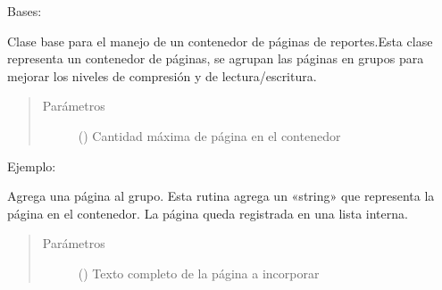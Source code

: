\documentclass[a4paper,12pt,spanish]{sphinxmanual}
\begin{document}
\begin{fulllineitems}
\label{\detokenize{openerm.PageContainer:openerm.PageContainer.PageContainer}}
Bases: 

Clase base para el manejo de un contenedor de páginas de reportes.Esta clase
representa un contenedor de páginas, se agrupan las páginas en grupos para mejorar
los niveles de compresión y de lectura/escritura.
\begin{quote}\begin{description}
\item[{Parámetros}] \leavevmode
{} () \textendash{} Cantidad máxima de página en el contenedor

\end{description}\end{quote}

Ejemplo:

\begin{sphinxVerbatim}[commandchars=\\\{\}]
   
  
\end{sphinxVerbatim}

\begin{fulllineitems}
\label{\detokenize{openerm.PageContainer:openerm.PageContainer.PageContainer.add}}
Agrega una página al grupo.     Esta rutina agrega un «string» que representa
la página en el contenedor. La página queda registrada en una lista interna.
\begin{quote}\begin{description}
\item[{Parámetros}] \leavevmode
{} () \textendash{} Texto completo de la página a incorporar


\end{description}
\end{quote}
\end{fulllineitems}
\end{fulllineitems}
\end{document}
